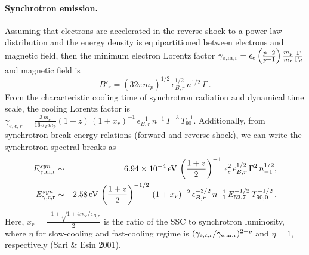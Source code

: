 \documentclass[11pt,twoside]{article}
\newcommand{\be}{\begin{equation}}
\newcommand{\ee}{\end{equation}}
\newcommand{\bary}{\begin{eqnarray}}
\newcommand{\eary}{\end{eqnarray}}
\begin{document}
\paragraph{Synchrotron emission.}
%
Assuming that electrons are accelerated in the reverse shock to a power-law distribution and the energy density is equipartitioned  between electrons and magnetic field, then the minimum electron Lorentz factor $\gamma_{\rm e,m,r}=\epsilon_{e}\left(\frac {p-2} {p-1}\right) \frac {m_p} {m_e}\frac{\Gamma}{\Gamma_{d}}$ and magnetic field is 
%
\be
B'_r=(32\pi m_p)^{1/2}\,\epsilon^{1/2}_{B,r}\,n^{1/2}\,\Gamma\,.
\ee
%
From the characteristic cooling time of synchrotron radiation and dynamical time scale, the cooling Lorentz factor is  $\gamma_{e,c,r}=\frac{3\,m_e}{16\,\sigma_T\,m_p}(1+z)\,(1+x_r)^{-1}\,\epsilon^{-1}_{B,r}\,n^{-1}\,\Gamma^{-3}\,T_{90}^{-1}$.  Additionally,  from  synchrotron break energy relations (forward and reverse shock), we can write the synchrotron spectral breaks as 
%
%
\bary\label{synrev_b}
E^{syn}_{\rm \gamma,m,r}&\sim& 6.94\times 10^{-4}\, {\rm eV}\,\left(\frac{1+z}{2}\right)^{-1}\,\epsilon_{e}^{2}\,\epsilon_{B,r}^{1/2}\,\Gamma^{2}\,n^{1/2}_{-1}, \cr
E^{syn}_{\rm \gamma,c,r}&\sim& 2.58\, {\rm eV}  \,\left(\frac{1+z}{2}\right)^{-1/2}\,(1+x_r)^{-2}\,\epsilon_{B,r}^{-3/2}\,n^{-1}_{-1}\,E^{-1/2}_{52.7}\,T_{90,0}^{-1/2}\,.
\eary
%
Here, $x_r=\frac{-1+\sqrt{1+4\eta \epsilon_{e}/\epsilon_{B,r}}}{2}$ is  the ratio of the SSC to synchrotron luminosity, where $\eta$ for slow-cooling and fast-cooling regime is  $(\gamma_{\rm e,c,r}/\gamma_{\rm e,m,r})^{2-p}$  and  $\eta=1$, respectively (Sari \& Esin 2001).  
%
\end{document}
